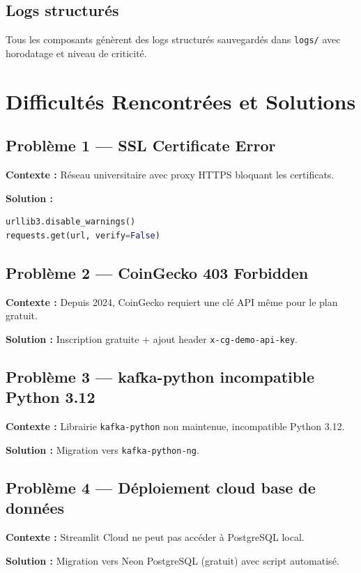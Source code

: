 \documentclass[12pt,a4paper]{article}
\begin{document}
\subsection{Logs structurés}
Tous les composants génèrent des logs structurés sauvegardés dans \texttt{logs/} avec horodatage et niveau de criticité.

\section{Difficultés Rencontrées et Solutions}

\subsection{Problème 1 --- SSL Certificate Error}
\textbf{Contexte :} Réseau universitaire avec proxy HTTPS bloquant les certificats.

\textbf{Solution :}
\begin{lstlisting}[language=Python]
urllib3.disable_warnings()
requests.get(url, verify=False)
\end{lstlisting}

\subsection{Problème 2 --- CoinGecko 403 Forbidden}
\textbf{Contexte :} Depuis 2024, CoinGecko requiert une clé API même pour le plan gratuit.

\textbf{Solution :} Inscription gratuite + ajout header \texttt{x-cg-demo-api-key}.

\subsection{Problème 3 --- kafka-python incompatible Python 3.12}
\textbf{Contexte :} Librairie \texttt{kafka-python} non maintenue, incompatible Python 3.12.

\textbf{Solution :} Migration vers \texttt{kafka-python-ng}.

\subsection{Problème 4 --- Déploiement cloud base de données}
\textbf{Contexte :} Streamlit Cloud ne peut pas accéder à PostgreSQL local.

\textbf{Solution :} Migration vers Neon PostgreSQL (gratuit) avec script automatisé.
\end{document}
